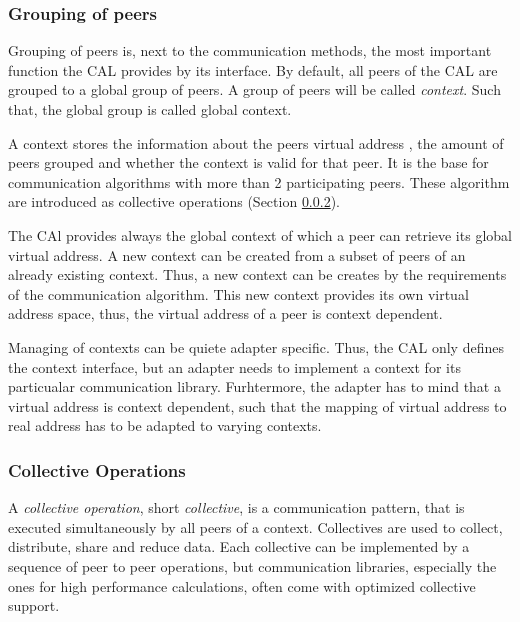 \subsubsection{Grouping of peers}
\label{sec:cal_context}
Grouping of peers is, next to the communication methods, the most
important function the CAL provides by its interface.  By default, all
peers of the CAL are grouped to a global group of peers.  A group of
peers will be called \textit{context}. Such that, the global group is
called global context.

A context stores the information about the peers virtual address , the
amount of peers grouped and whether the context is valid for that
peer. It is the base for communication algorithms with more than 2
participating peers. These algorithm are introduced as collective
operations (Section \ref{sec:cal_collective}).

The CAl provides always the global context of which a peer
can retrieve its global virtual address. A new context can
be created from a subset of peers of an already existing
context. Thus, a new context can be creates by the
requirements of the communication algorithm. This new context
provides its own virtual address space, thus, the virtual
address of a peer is context dependent.

Managing of contexts can be quiete adapter specific. Thus, the CAL
only defines the context interface, but an adapter needs to implement
a context for its particualar communication library. Furhtermore, the
adapter has to mind that a virtual address is context dependent, such
that the mapping of virtual address to real address has to be adapted
to varying contexts.

\subsubsection{Collective Operations}
\label{sec:cal_collective}
A \textit{collective operation}, short \textit{collective}, is a
communication pattern, that is executed simultaneously by all peers of
a context. Collectives are used to collect, distribute, share and
reduce data.  Each collective can be implemented by a sequence of peer
to peer operations, but communication libraries, especially the ones for
high performance calculations, often come with optimized collective support.

